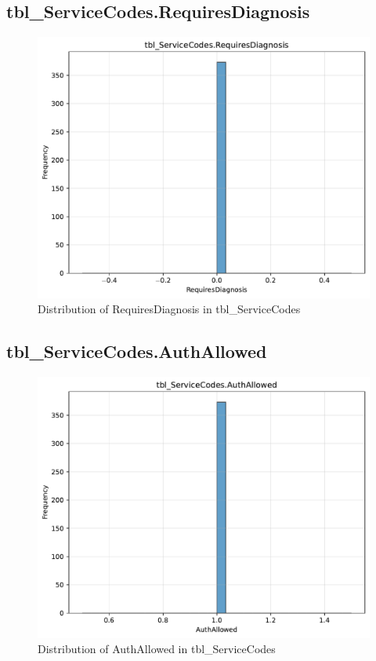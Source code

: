\subsection{tbl\_ServiceCodes.RequiresDiagnosis}

\begin{figure}[htbp]
\centering
\includegraphics[width=\textwidth]{figures/dbo_tbl_ServiceCodes_RequiresDiagnosis.pdf}
\caption{Distribution of RequiresDiagnosis in tbl\_ServiceCodes}
\end{figure}\newpage

\subsection{tbl\_ServiceCodes.AuthAllowed}

\begin{figure}[htbp]
\centering
\includegraphics[width=\textwidth]{figures/dbo_tbl_ServiceCodes_AuthAllowed.pdf}
\caption{Distribution of AuthAllowed in tbl\_ServiceCodes}
\end{figure}\newpage

